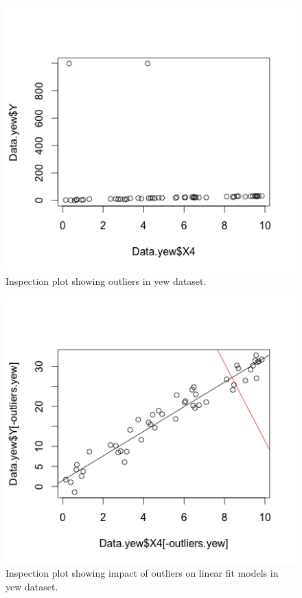 \documentclass{article}
\begin{document}
\begin{figure}[h!]
  \includegraphics[width=\linewidth]{project/images/11-yew.png}
  \caption{Inspection plot showing outliers in yew dataset.}
  \label{fig:11-yew}
\end{figure}

\begin{figure}[h!]
  \includegraphics[width=\linewidth]{project/images/12-yew.png}
  \caption{Inspection plot showing impact of outliers on linear fit models in yew dataset.}
  \label{fig:12-yew}
\end{figure}
\end{document}
